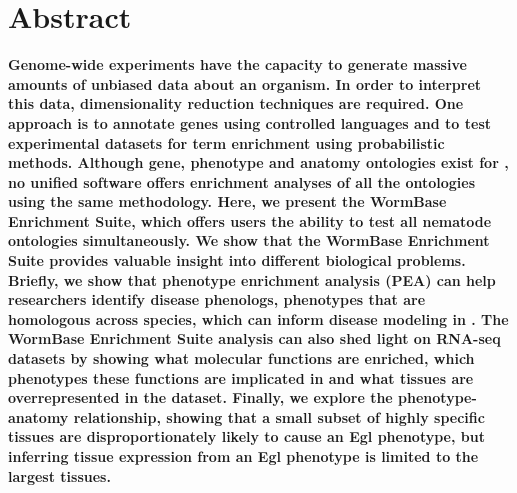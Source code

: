 \newcommand{\hobesity}{957}
\newcommand{\wobesity}{614}
\newcommand{\hlupus}{283}
\newcommand{\wlupus}{135}
\newcommand{\harthritis}{309}
\newcommand{\warthritis}{124}

\newcommand{\ra}[1]{\renewcommand{\arraystretch}{#1}}


\section*{Abstract}
\textbf{
Genome-wide experiments have the capacity to generate massive amounts of unbiased
data about an organism. In order to interpret this data, dimensionality reduction
techniques are required. One approach is to annotate genes using controlled languages
and to test experimental datasets for term enrichment using probabilistic methods.
Although gene, phenotype and anatomy ontologies exist for \cel{}, no unified
software offers enrichment analyses of all the ontologies using the same methodology.
Here, we present the WormBase Enrichment Suite, which offers users the
ability to test all nematode ontologies simultaneously. We show that
the WormBase Enrichment Suite provides valuable insight into different
biological problems. Briefly, we show that phenotype enrichment analysis (PEA) can
help researchers identify disease phenologs, phenotypes that are homologous across species,
which can inform disease modeling in \cel{}. The WormBase Enrichment Suite
analysis can also shed light on RNA-seq datasets by showing what
molecular functions are enriched, which phenotypes these functions are implicated
in and what tissues are overrepresented in the dataset. Finally, we explore the
phenotype-anatomy relationship, showing that a small subset of highly specific
tissues are disproportionately likely to cause an Egl phenotype, but inferring
tissue expression from an Egl phenotype is limited to the largest tissues.
}


